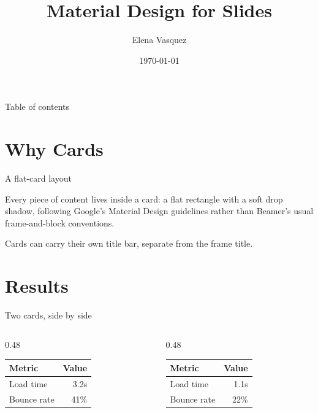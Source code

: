 \documentclass{beamer}
\title{Material Design for Slides}
\author{Elena Vasquez}
\date{\today}
\begin{document}
\begin{frame}
  \titlepage
\end{frame}

\begin{frame}{Table of contents}
  \begin{card}
    \tableofcontents
  \end{card}
\end{frame}

\section{Why Cards}

\begin{frame}{A flat-card layout}
  \begin{card}
    Every piece of content lives inside a card: a flat rectangle with a soft
    drop shadow, following Google's Material Design guidelines rather than
    Beamer's usual frame-and-block conventions.
  \end{card}
  \begin{card}
    Cards can carry their own title bar, separate from the frame title.
  \end{card}
\end{frame}

\section{Results}

\begin{frame}{Two cards, side by side}
  \begin{columns}[T]
    \begin{column}{0.48\textwidth}
      \begin{card}[Before]
        \begin{tabular}{lr}
          \toprule
          Metric & Value \\
          \midrule
          Load time & 3.2s \\
          Bounce rate & 41\% \\
          \bottomrule
        \end{tabular}
      \end{card}
    \end{column}
    \begin{column}{0.48\textwidth}
      \begin{cardTiny}
        \begin{tabular}{lr}
          \toprule
          Metric & Value \\
          \midrule
          Load time & 1.1s \\
          Bounce rate & 22\% \\
          \bottomrule
        \end{tabular}
      \end{cardTiny}
    \end{column}
  \end{columns}
\end{frame}
\end{document}
